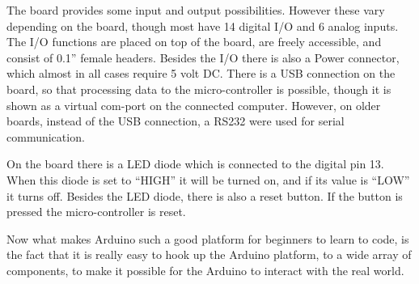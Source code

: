 The board provides some input and output possibilities. However these vary depending on the board, though most have 14 digital I/O and 6 analog inputs. The I/O functions are placed on top of the board, are freely accessible, and consist of 0.1'' female headers. Besides the I/O there is also a Power connector, which almost in all cases require 5 volt DC. There is a USB connection on the board, so that processing data to the micro-controller is possible, though it is shown as a virtual com-port on the connected computer. However, on older boards, instead of the USB connection, a RS232 were used for serial communication. 

On the board there is a LED diode which is connected to the digital pin 13. When this diode is set to ``HIGH'' it will be turned on, and if its value is ``LOW'' it turns off. Besides the LED diode, there is also a reset button. If the button is pressed the micro-controller is reset. 

Now what makes Arduino such a good platform for beginners to learn to code, is the fact that it is really easy to hook up the Arduino platform, to a wide array of components, to make it possible for the Arduino to interact with the real world.

